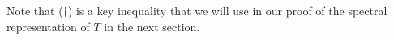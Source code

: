 \begin{remark}\label{dagger}
   Note that (\( \dagger \)) is a key inequality that we will use in our proof of the spectral representation of \( T  \) in the next section.
\end{remark}

